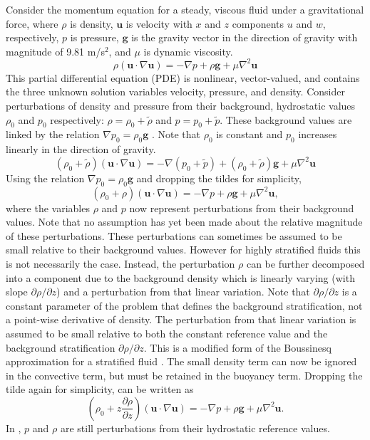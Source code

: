 \documentclass[12pt]{article}
\begin{document}
Consider the momentum equation  for a steady, viscous fluid under a gravitational force, where $\rho$ is density, $\mathbf{u}$ is velocity with $x$ and $z$ components $u$ and $w$, respectively, $p$ is pressure, $\mathbf{g}$ is the gravity vector in the direction of gravity with magnitude of 9.81 m/s$^2$, and $\mu$ is dynamic viscosity.
\begin{equation}
\label{eq:momentumstationary}
\rho(\mathbf{u}\cdot\nabla\mathbf{u})=-\nabla p + \rho\mathbf{g}+\mu\nabla^2\mathbf{u}
\end{equation}
This partial differential equation (PDE) is nonlinear, vector-valued, and contains the three unknown solution variables velocity, pressure, and density. Consider perturbations of density and pressure from their background, hydrostatic values $\rho_0$ and $p_0$ respectively: $\rho = \rho_0 + \tilde{\rho}$ and $p = p_0 + \tilde{p}$. These background values are linked by the relation $\nabla p_0 = \rho_0\mathbf{g}$ \cite{turner1979buoyancy}. Note that $\rho_0$ is constant and $p_0$ increases linearly in the direction of gravity.
\begin{equation}
(\rho_0+\tilde{\rho})(\mathbf{u}\cdot\nabla\mathbf{u})=-\nabla(p_0+\tilde{p}) + (\rho_0+\tilde{\rho})\mathbf{g}+\mu\nabla^2\mathbf{u}
\end{equation}
Using the relation $\nabla p_0 = \rho_0\mathbf{g}$ and dropping the tildes for simplicity,
\begin{equation}
\label{eq:NS0}
(\rho_0+\rho)(\mathbf{u}\cdot\nabla\mathbf{u})=-\nabla p + \rho\mathbf{g}+\mu\nabla^2\mathbf{u},
\end{equation}
where the variables $\rho$ and $p$ now represent perturbations from their background values. Note that no assumption has yet been made about the relative magnitude of these perturbations. These perturbations can sometimes be assumed to be small relative to their background values. However for highly stratified fluids this is not necessarily the case. Instead, the perturbation $\rho$ can be further decomposed into a component due to the background density which is linearly varying (with slope $\partial\rho/\partial z$) and a perturbation from that linear variation. Note that $\partial\rho/\partial z$ is a constant parameter of the problem that defines the background stratification, not a point-wise derivative of density. The perturbation from that linear variation is assumed to be small relative to both the constant reference value and the background stratification $\partial\rho/\partial z$. This is a modified form of the Boussinesq approximation for a stratified fluid \cite{turner1979buoyancy}. The small density term can now be ignored in the convective term, but must be retained in the buoyancy term. Dropping the tilde again for simplicity,  can be written as
\begin{equation}
\label{eq:NS}
\left(\rho_0+z\frac{\partial\rho}{\partial z}\right)(\mathbf{u}\cdot\nabla\mathbf{u})=-\nabla p + \rho\mathbf{g}+\mu\nabla^2\mathbf{u}.
\end{equation}
In , $p$ and $\rho$ are still perturbations from their hydrostatic reference values.
\end{document}
